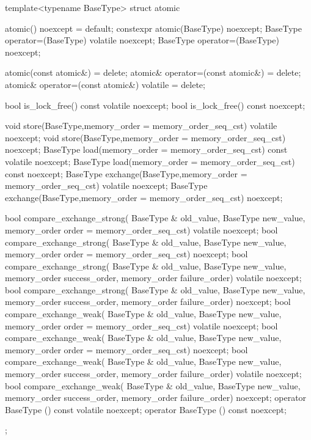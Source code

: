 \begin{cpp}
template<typename BaseType>
struct atomic
{
  atomic() noexcept = default;
  constexpr atomic(BaseType) noexcept;
  BaseType operator=(BaseType) volatile noexcept;
  BaseType operator=(BaseType) noexcept;

  atomic(const atomic&) = delete;
  atomic& operator=(const atomic&) = delete;
  atomic& operator=(const atomic&) volatile = delete;

  bool is_lock_free() const volatile noexcept;
  bool is_lock_free() const noexcept;

  void store(BaseType,memory_order = memory_order_seq_cst)
      volatile noexcept;
  void store(BaseType,memory_order = memory_order_seq_cst) noexcept;
  BaseType load(memory_order = memory_order_seq_cst)
      const volatile noexcept;
  BaseType load(memory_order = memory_order_seq_cst) const noexcept;
  BaseType exchange(BaseType,memory_order = memory_order_seq_cst)
      volatile noexcept;
  BaseType exchange(BaseType,memory_order = memory_order_seq_cst)
      noexcept;

  bool compare_exchange_strong(
      BaseType & old_value, BaseType new_value,
      memory_order order = memory_order_seq_cst) volatile noexcept;
  bool compare_exchange_strong(
      BaseType & old_value, BaseType new_value,
      memory_order order = memory_order_seq_cst) noexcept;
  bool compare_exchange_strong(
      BaseType & old_value, BaseType new_value,
      memory_order success_order,
      memory_order failure_order) volatile noexcept;
  bool compare_exchange_strong(
      BaseType & old_value, BaseType new_value,
      memory_order success_order,
      memory_order failure_order) noexcept;
  bool compare_exchange_weak(
      BaseType & old_value, BaseType new_value,
      memory_order order = memory_order_seq_cst)
      volatile noexcept;
  bool compare_exchange_weak(
      BaseType & old_value, BaseType new_value,
      memory_order order = memory_order_seq_cst) noexcept;
  bool compare_exchange_weak(
      BaseType & old_value, BaseType new_value,
      memory_order success_order,
      memory_order failure_order) volatile noexcept;
  bool compare_exchange_weak(
      BaseType & old_value, BaseType new_value,
      memory_order success_order,
      memory_order failure_order) noexcept;
      operator BaseType () const volatile noexcept;
      operator BaseType () const noexcept;
};


\end{cpp}
